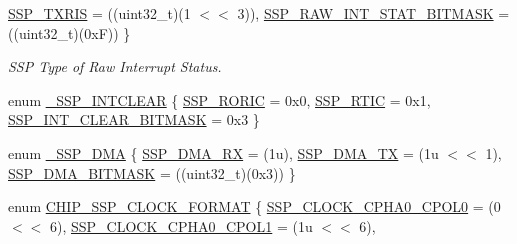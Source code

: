 \begin{DoxyCompactItemize}
\hyperlink{group___s_s_p__18_x_x__43_x_x_gga2042535e55396776c81a7235ed95db35a0f19a960fdb1f4e1e41c2d3f391ab2a1}{S\+S\+P\+\_\+\+T\+X\+R\+IS} = ((uint32\+\_\+t)(1 $<$$<$ 3)), 
\newline
\hyperlink{group___s_s_p__18_x_x__43_x_x_gga2042535e55396776c81a7235ed95db35a81d12ba594dec3491731ef65c4af785e}{S\+S\+P\+\_\+\+R\+A\+W\+\_\+\+I\+N\+T\+\_\+\+S\+T\+A\+T\+\_\+\+B\+I\+T\+M\+A\+SK} = ((uint32\+\_\+t)(0xF))
 \}\begin{DoxyCompactList}\small\item\em S\+SP Type of Raw Interrupt Status. \end{DoxyCompactList}
\item 
enum \hyperlink{group___s_s_p__18_x_x__43_x_x_ga59cc14c5381f32c16286c45bd6a3ece0}{\+\_\+\+S\+S\+P\+\_\+\+I\+N\+T\+C\+L\+E\+AR} \{ \hyperlink{group___s_s_p__18_x_x__43_x_x_gga59cc14c5381f32c16286c45bd6a3ece0a3f8b48b9a600a7c3d1615c88abf76981}{S\+S\+P\+\_\+\+R\+O\+R\+IC} = 0x0, 
\hyperlink{group___s_s_p__18_x_x__43_x_x_gga59cc14c5381f32c16286c45bd6a3ece0a5c9358a05d7509ce431770ca872cdce0}{S\+S\+P\+\_\+\+R\+T\+IC} = 0x1, 
\hyperlink{group___s_s_p__18_x_x__43_x_x_gga59cc14c5381f32c16286c45bd6a3ece0acf79b0a911e1c9d4cee5387be0dc45ba}{S\+S\+P\+\_\+\+I\+N\+T\+\_\+\+C\+L\+E\+A\+R\+\_\+\+B\+I\+T\+M\+A\+SK} = 0x3
 \}
\item 
enum \hyperlink{group___s_s_p__18_x_x__43_x_x_gaee679ef8477b8e31bf174e66e2984caf}{\+\_\+\+S\+S\+P\+\_\+\+D\+MA} \{ \hyperlink{group___s_s_p__18_x_x__43_x_x_ggaee679ef8477b8e31bf174e66e2984cafae51f79e5713056c61aadb8d5ddfc335a}{S\+S\+P\+\_\+\+D\+M\+A\+\_\+\+RX} = (1u), 
\hyperlink{group___s_s_p__18_x_x__43_x_x_ggaee679ef8477b8e31bf174e66e2984cafa5925a5061635b0742605b6bb4b434ce4}{S\+S\+P\+\_\+\+D\+M\+A\+\_\+\+TX} = (1u $<$$<$ 1), 
\hyperlink{group___s_s_p__18_x_x__43_x_x_ggaee679ef8477b8e31bf174e66e2984cafa8e393687f85f713df0927a4c6f45679e}{S\+S\+P\+\_\+\+D\+M\+A\+\_\+\+B\+I\+T\+M\+A\+SK} = ((uint32\+\_\+t)(0x3))
 \}
\item 
enum \hyperlink{group___s_s_p__18_x_x__43_x_x_gab423240914ad746147aeb31f483e9553}{C\+H\+I\+P\+\_\+\+S\+S\+P\+\_\+\+C\+L\+O\+C\+K\+\_\+\+F\+O\+R\+M\+AT} \{ \newline
\hyperlink{group___s_s_p__18_x_x__43_x_x_ggab423240914ad746147aeb31f483e9553aa5340f759c78820f18de9290b9c061c9}{S\+S\+P\+\_\+\+C\+L\+O\+C\+K\+\_\+\+C\+P\+H\+A0\+\_\+\+C\+P\+O\+L0} = (0 $<$$<$ 6), 
\hyperlink{group___s_s_p__18_x_x__43_x_x_ggab423240914ad746147aeb31f483e9553abf7efd605c96ca17f8d3e142583573c7}{S\+S\+P\+\_\+\+C\+L\+O\+C\+K\+\_\+\+C\+P\+H\+A0\+\_\+\+C\+P\+O\+L1} = (1u $<$$<$ 6), 

\end{DoxyCompactItemize}
